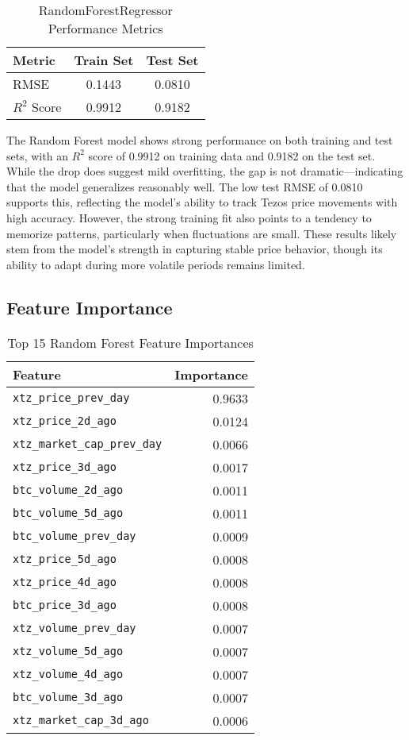 \begin{table}[H]
\centering
\caption{RandomForestRegressor Performance Metrics}
\label{tab:randomforest-performance}
\begin{tabular}{lcc}
\toprule
\textbf{Metric} & \textbf{Train Set} & \textbf{Test Set} \\
\midrule
RMSE           & 0.1443             & 0.0810            \\
$R^2$ Score    & 0.9912             & 0.9182            \\
\bottomrule
\end{tabular}
\end{table}

The Random Forest model shows strong performance on both training and test sets, with an $R^2$ score of 0.9912 on training data and 0.9182 on the test set. 
While the drop does suggest mild overfitting, the gap is not dramatic—indicating that the model generalizes reasonably well. 
The low test RMSE of 0.0810 supports this, reflecting the model’s ability to track Tezos price movements with high accuracy. 
However, the strong training fit also points to a tendency to memorize patterns, particularly when fluctuations are small. 
These results likely stem from the model’s strength in capturing stable price behavior, though its ability to adapt during more volatile periods remains limited.


\subsection{Feature Importance}
\begin{table}[H]
\centering
\caption{Top 15 Random Forest Feature Importances}
\label{tab:randomforest-feature-importance}
\begin{tabular}{lr}
\toprule
\textbf{Feature} & \textbf{Importance} \\
\midrule
\texttt{xtz\_price\_prev\_day}   & 0.9633 \\
\texttt{xtz\_price\_2d\_ago}     & 0.0124 \\
\texttt{xtz\_market\_cap\_prev\_day} & 0.0066 \\
\texttt{xtz\_price\_3d\_ago}     & 0.0017 \\
\texttt{btc\_volume\_2d\_ago}    & 0.0011 \\
\texttt{btc\_volume\_5d\_ago}    & 0.0011 \\
\texttt{btc\_volume\_prev\_day}  & 0.0009 \\
\texttt{xtz\_price\_5d\_ago}     & 0.0008 \\
\texttt{xtz\_price\_4d\_ago}     & 0.0008 \\
\texttt{btc\_price\_3d\_ago}     & 0.0008 \\
\texttt{xtz\_volume\_prev\_day}  & 0.0007 \\
\texttt{xtz\_volume\_5d\_ago}    & 0.0007 \\
\texttt{xtz\_volume\_4d\_ago}    & 0.0007 \\
\texttt{btc\_volume\_3d\_ago}    & 0.0007 \\
\texttt{xtz\_market\_cap\_3d\_ago} & 0.0006 \\
\bottomrule
\end{tabular}
\end{table}

